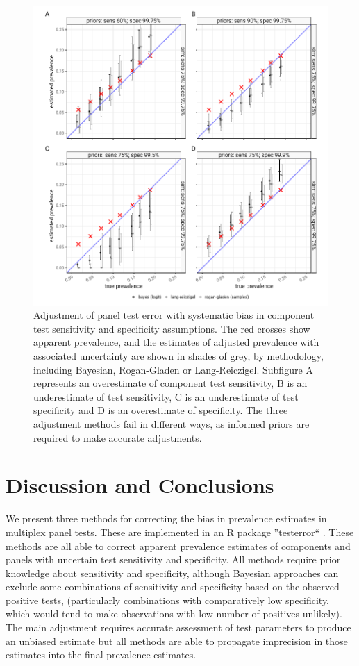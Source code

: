 \documentclass[a4paper, 12pt, twoside]{article}
\let\Oldsection\section
\renewcommand{\section}{\FloatBarrier\Oldsection}
\begin{document}
\begin{figure}[h!]
\centering
  \includegraphics{fig/bayesian_sim_mismatch_v2}
  \caption{Adjustment of panel test error with systematic bias in component test sensitivity and specificity assumptions. The red crosses show apparent prevalence, and the estimates of adjusted prevalence with associated uncertainty are shown in shades of grey, by methodology, including Bayesian, Rogan-Gladen or Lang-Reiczigel. Subfigure A represents an overestimate of component test sensitivity, B is an underestimate of test sensitivity, C is an underestimate of test specificity and D is an overestimate of specificity. The three adjustment methods fail in different ways, as informed priors are required to make accurate adjustments.}
\label{fig:B5}
\end{figure}

\section{Discussion and Conclusions}

We present three methods for correcting the bias in prevalence estimates in multiplex panel tests. These are implemented in an R package ''testerror`` \cite{challen2023}. These methods are all able to correct apparent prevalence estimates of components and panels with uncertain test sensitivity and specificity. All methods require prior knowledge about sensitivity and specificity, although Bayesian approaches can exclude some combinations of sensitivity and specificity based on the observed positive tests, (particularly combinations with comparatively low specificity, which would tend to make observations with low number of positives unlikely). The main adjustment requires accurate assessment of test parameters to produce an unbiased estimate but all methods are able to propagate imprecision in those estimates into the final prevalence estimates.
\end{document}
